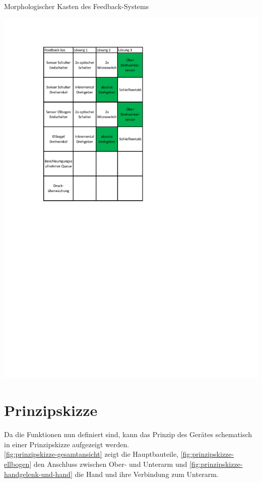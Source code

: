 	\begin{table}[h]
		\caption[Morphologischer Kasten des Feedback-Systems]{Morphologischer Kasten des Feedback-Systems}
		\centering
		\includegraphics[width=\textwidth]{"Abb/Morphologischer Kasten Feedback-System"}
		\label{fig:morphologische-kasten-feedback-system}
	\end{table}

\section{Prinzipskizze}
	Da die Funktionen nun definiert sind, kann das Prinzip des Gerätes schematisch in einer Prinzipskizze aufgezeigt werden.\\
	\cref{fig:prinzipskizze-gesamtansicht} zeigt die Hauptbauteile, \cref{fig:prinzipskizze-ellbogen} den Anschluss zwischen Ober- und Unterarm und \cref{fig:prinzipskizze-handgelenk-und-hand} die Hand und ihre Verbindung zum Unterarm.

